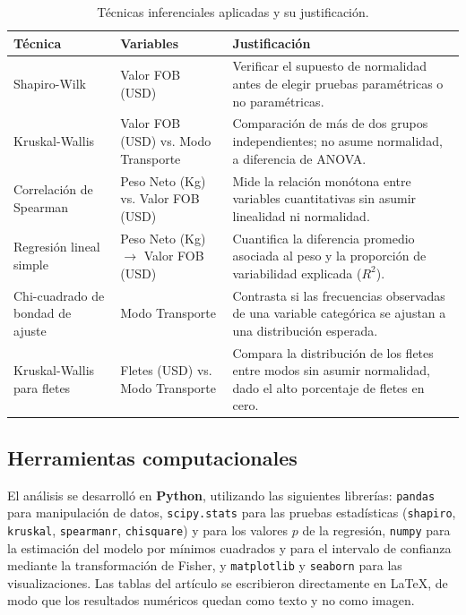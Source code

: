 \documentclass[12pt]{article}
\begin{document}
\begin{table}[htbp]
    \centering
    \caption{Técnicas inferenciales aplicadas y su justificación.}
    \label{tab:tecnicas}
    \begin{tabular}{>{\raggedright\arraybackslash}p{3.4cm}>{\raggedright\arraybackslash}p{4.4cm}>{\raggedright\arraybackslash}p{6.4cm}}
        \toprule
        \textbf{Técnica} & \textbf{Variables} & \textbf{Justificación} \\
        \midrule
        Shapiro-Wilk & Valor FOB (USD) & Verificar el supuesto de normalidad antes de elegir pruebas paramétricas o no paramétricas. \\
        Kruskal-Wallis & Valor FOB (USD) vs. Modo Transporte & Comparación de más de dos grupos independientes; no asume normalidad, a diferencia de ANOVA. \\
        Correlación de Spearman & Peso Neto (Kg) vs. Valor FOB (USD) & Mide la relación monótona entre variables cuantitativas sin asumir linealidad ni normalidad. \\
        Regresión lineal simple & Peso Neto (Kg) $\rightarrow$ Valor FOB (USD) & Cuantifica la diferencia promedio asociada al peso y la proporción de variabilidad explicada ($R^2$). \\
        Chi-cuadrado de bondad de ajuste & Modo Transporte & Contrasta si las frecuencias observadas de una variable categórica se ajustan a una distribución esperada. \\
        Kruskal-Wallis para fletes & Fletes (USD) vs. Modo Transporte & Compara la distribución de los fletes entre modos sin asumir normalidad, dado el alto porcentaje de fletes en cero. \\
        \bottomrule
    \end{tabular}
\end{table}

\subsection*{Herramientas computacionales}

El análisis se desarrolló en \textbf{Python}, utilizando las
siguientes librerías: \texttt{pandas} para manipulación de datos,
\texttt{scipy.stats} para las pruebas estadísticas (\texttt{shapiro},
\texttt{kruskal}, \texttt{spearmanr}, \texttt{chisquare}) y para los
valores \(p\) de la regresión, \texttt{numpy} para la estimación del
modelo por mínimos cuadrados y para el intervalo de confianza mediante
la transformación de Fisher, y \texttt{matplotlib} y \texttt{seaborn}
para las visualizaciones. Las tablas del artículo se escribieron
directamente en LaTeX, de modo que los resultados numéricos quedan como
texto y no como imagen.
\end{document}
